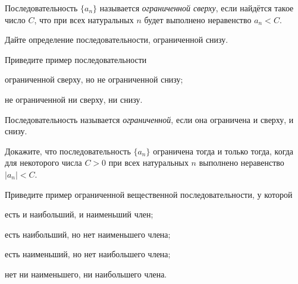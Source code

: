 \documentclass[a4paper, 12pt, num=2426, date=01.09.2020]{listok}
\begin{document}
\begin{definition}
    Последовательность $\{a_n\}$ называется \textit{ограниченной сверху}, если найдётся такое число $C$,
    что при всех натуральных $n$ будет выполнено неравенство $a_n < C$.
\end{definition}

\begin{problem}
    Дайте определение последовательности, ограниченной снизу.
\end{problem}

\begin{problem}
    Приведите пример последовательности
    \begin{probparts}
        \item ограниченной сверху, но не ограниченной снизу;
        \item не ограниченной ни сверху, ни снизу.
    \end{probparts}
\end{problem}

\begin{definition}
    Последовательность называется \textit{ограниченной}, если она ограничена и сверху, и снизу.
\end{definition}

\begin{problem}
    Докажите, что последовательность $\{a_n\}$ ограничена тогда и только тогда,
    когда для некоторого числа $C > 0$ при всех натуральных $n$ выполнено неравенство $|a_n| < C$.
\end{problem}

\begin{problem}
    Приведите пример ограниченной вещественной последовательности, у которой
    \begin{probparts}
        \item есть и наибольший, и наименьший член;
        \item есть наибольший, но нет наименьшего члена;
        \item есть наименьший, но нет наибольшего члена;
        \item нет ни наименьшего, ни наибольшего члена.
    \end{probparts}
\end{problem}
\end{document}
